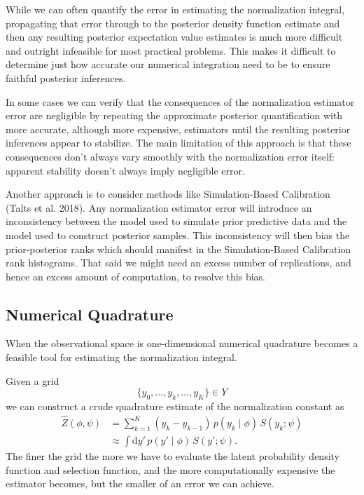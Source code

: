 \documentclass[
  letterpaper,
  DIV=11,
  numbers=noendperiod]{scrartcl}
\begin{document}
While we can often quantify the error in estimating the normalization
integral, propagating that error through to the posterior density
function estimate and then any resulting posterior expectation value
estimates is much more difficult and outright infeasible for most
practical problems. This makes it difficult to determine just how
accurate our numerical integration need to be to ensure faithful
posterior inferences.

In some cases we can verify that the consequences of the normalization
estimator error are negligible by repeating the approximate posterior
quantification with more accurate, although more expensive, estimators
until the resulting posterior inferences appear to stabilize. The main
limitation of this approach is that these consequences don't always vary
smoothly with the normalization error itself: apparent stability doesn't
always imply negligible error.

Another approach is to consider methods like Simulation-Based
Calibration (Talts et al. 2018). Any normalization estimator error will
introduce an inconsistency between the model used to simulate prior
predictive data and the model used to construct posterior samples. This
inconsistency will then bias the prior-posterior ranks which should
manifest in the Simulation-Based Calibration rank histograms. That said
we might need an excess number of replications, and hence an excess
amount of computation, to resolve this bias.

\subsection{Numerical Quadrature}\label{numerical-quadrature}

When the observational space is one-dimensional numerical quadrature
becomes a feasible tool for estimating the normalization integral.

Given a grid \[
\{ y_{0}, \ldots, y_{k}, \ldots, y_{K} \} \in Y
\] we can construct a crude quadrature estimate of the normalization
constant as \begin{align*}
\hat{Z}(\phi, \psi)
&=
\sum_{k = 1}^{K} (y_{k} - y_{k - 1}) \, p(y_{k} \mid \phi) \, S(y_{k}; \psi )
\\
&\approx
\int \mathrm{d}y' \, p(y' \mid \phi) \, S(y'; \psi ).
\end{align*} The finer the grid the more we have to evaluate the latent
probability density function and selection function, and the more
computationally expensive the estimator becomes, but the smaller of an
error we can achieve.
\end{document}
